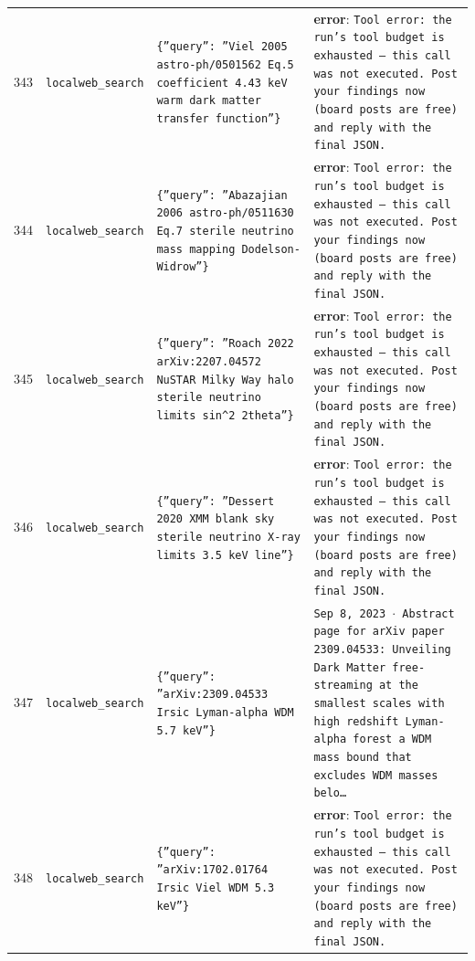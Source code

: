 \documentclass[11pt,a4paper]{article}
\begin{document}
\begin{longtable}{@{}p{}p{}p{}p{}@{}}
343 & \texttt{local}\newline\texttt{web\_\allowbreak{}search} & \texttt{\{''query'':\allowbreak{} ''Viel 2005 astro-ph/\allowbreak{}0501562 Eq.5 coefficient 4.43 keV warm dark matter transfer function''\}\allowbreak{}} & \textbf{error}: \texttt{Tool error:\allowbreak{} the run's tool budget is exhausted --- this call was not executed. Post your findings now (board posts are free)\allowbreak{} and reply with the final JSON.} \\
344 & \texttt{local}\newline\texttt{web\_\allowbreak{}search} & \texttt{\{''query'':\allowbreak{} ''Abazajian 2006 astro-ph/\allowbreak{}0511630 Eq.7 sterile neutrino mass mapping Dodelson-Widrow''\}\allowbreak{}} & \textbf{error}: \texttt{Tool error:\allowbreak{} the run's tool budget is exhausted --- this call was not executed. Post your findings now (board posts are free)\allowbreak{} and reply with the final JSON.} \\
345 & \texttt{local}\newline\texttt{web\_\allowbreak{}search} & \texttt{\{''query'':\allowbreak{} ''Roach 2022 arXiv:\allowbreak{}2207.04572 NuSTAR Milky Way halo sterile neutrino limits sin\textasciicircum{}\allowbreak{}2 2theta''\}\allowbreak{}} & \textbf{error}: \texttt{Tool error:\allowbreak{} the run's tool budget is exhausted --- this call was not executed. Post your findings now (board posts are free)\allowbreak{} and reply with the final JSON.} \\
346 & \texttt{local}\newline\texttt{web\_\allowbreak{}search} & \texttt{\{''query'':\allowbreak{} ''Dessert 2020 XMM blank sky sterile neutrino X-ray limits 3.5 keV line''\}\allowbreak{}} & \textbf{error}: \texttt{Tool error:\allowbreak{} the run's tool budget is exhausted --- this call was not executed. Post your findings now (board posts are free)\allowbreak{} and reply with the final JSON.} \\
347 & \texttt{local}\newline\texttt{web\_\allowbreak{}search} & \texttt{\{''query'':\allowbreak{} ''arXiv:\allowbreak{}2309.04533 Irsic Lyman-alpha WDM 5.7 keV''\}\allowbreak{}} & \texttt{Sep 8,\allowbreak{} 2023 $\cdot$ Abstract page for arXiv paper 2309.04533:\allowbreak{} Unveiling Dark Matter free-streaming at the smallest scales with high redshift Lyman-alpha forest a WDM mass bound that excludes WDM masses belo\ldots{}\allowbreak{}} \\
348 & \texttt{local}\newline\texttt{web\_\allowbreak{}search} & \texttt{\{''query'':\allowbreak{} ''arXiv:\allowbreak{}1702.01764 Irsic Viel WDM 5.3 keV''\}\allowbreak{}} & \textbf{error}: \texttt{Tool error:\allowbreak{} the run's tool budget is exhausted --- this call was not executed. Post your findings now (board posts are free)\allowbreak{} and reply with the final JSON.} \\

\end{longtable}
\end{document}
